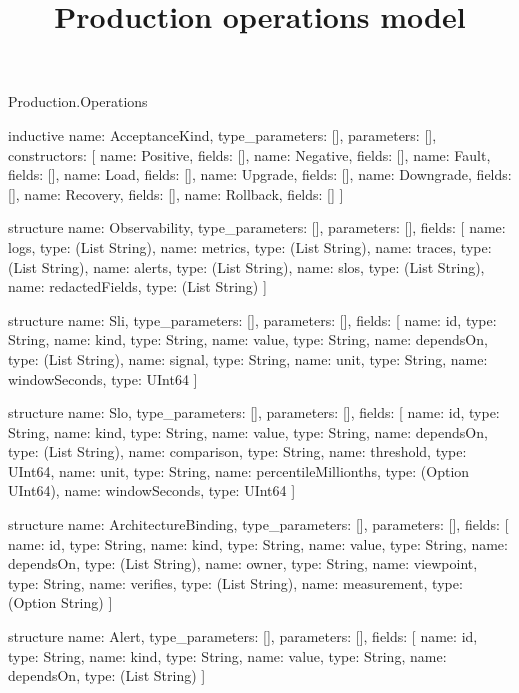 \begin{lexlean}{Production.Operations}
\title{Production operations model}
\begin{semanticmodule}
inductive{
  name: AcceptanceKind,
  type_parameters: [],
  parameters: [],
  constructors: [
    {name: Positive, fields: []},
    {name: Negative, fields: []},
    {name: Fault, fields: []},
    {name: Load, fields: []},
    {name: Upgrade, fields: []},
    {name: Downgrade, fields: []},
    {name: Recovery, fields: []},
    {name: Rollback, fields: []}
  ]
}

structure{
  name: Observability,
  type_parameters: [],
  parameters: [],
  fields: [
    {name: logs, type: (List String)},
    {name: metrics, type: (List String)},
    {name: traces, type: (List String)},
    {name: alerts, type: (List String)},
    {name: slos, type: (List String)},
    {name: redactedFields, type: (List String)}
  ]
}

structure{
  name: Sli,
  type_parameters: [],
  parameters: [],
  fields: [
    {name: id, type: String},
    {name: kind, type: String},
    {name: value, type: String},
    {name: dependsOn, type: (List String)},
    {name: signal, type: String},
    {name: unit, type: String},
    {name: windowSeconds, type: UInt64}
  ]
}

structure{
  name: Slo,
  type_parameters: [],
  parameters: [],
  fields: [
    {name: id, type: String},
    {name: kind, type: String},
    {name: value, type: String},
    {name: dependsOn, type: (List String)},
    {name: comparison, type: String},
    {name: threshold, type: UInt64},
    {name: unit, type: String},
    {name: percentileMillionths, type: (Option UInt64)},
    {name: windowSeconds, type: UInt64}
  ]
}

structure{
  name: ArchitectureBinding,
  type_parameters: [],
  parameters: [],
  fields: [
    {name: id, type: String},
    {name: kind, type: String},
    {name: value, type: String},
    {name: dependsOn, type: (List String)},
    {name: owner, type: String},
    {name: viewpoint, type: String},
    {name: verifies, type: (List String)},
    {name: measurement, type: (Option String)}
  ]
}

structure{
  name: Alert,
  type_parameters: [],
  parameters: [],
  fields: [
    {name: id, type: String},
    {name: kind, type: String},
    {name: value, type: String},
    {name: dependsOn, type: (List String)}
  ]
}


\end{semanticmodule}
\end{lexlean}

